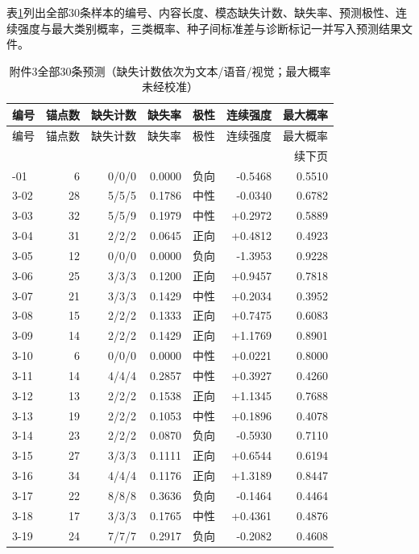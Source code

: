 表\ref{q2:tab:a3}列出全部30条样本的编号、内容长度、模态缺失计数、缺失率、预测极性、连续强度与最大类别概率，三类概率、种子间标准差与诊断标记一并写入预测结果文件。
{\small
\setlength{\tabcolsep}{4pt}
\begin{longtable}{lrrrrrr}
\caption{附件3全部30条预测（缺失计数依次为文本/语音/视觉；最大概率未经校准）}\label{q2:tab:a3}\\
\toprule
编号 & 锚点数 & 缺失计数 & 缺失率 & 极性 & 连续强度 & 最大概率 \\
\midrule
\endfirsthead
\toprule
编号 & 锚点数 & 缺失计数 & 缺失率 & 极性 & 连续强度 & 最大概率 \\
\midrule
\endhead
\midrule
\multicolumn{7}{r}{续下页}\\
\endfoot
\bottomrule
\endlastfoot
3-01 & 6 & 0/0/0 & 0.0000 & 负向 & -0.5468 & 0.5510 \\
3-02 & 28 & 5/5/5 & 0.1786 & 中性 & -0.0340 & 0.6782 \\
3-03 & 32 & 5/5/9 & 0.1979 & 中性 & +0.2972 & 0.5889 \\
3-04 & 31 & 2/2/2 & 0.0645 & 正向 & +0.4812 & 0.4923 \\
3-05 & 12 & 0/0/0 & 0.0000 & 负向 & -1.3953 & 0.9228 \\
3-06 & 25 & 3/3/3 & 0.1200 & 正向 & +0.9457 & 0.7818 \\
3-07 & 21 & 3/3/3 & 0.1429 & 中性 & +0.2034 & 0.3952 \\
3-08 & 15 & 2/2/2 & 0.1333 & 正向 & +0.7475 & 0.6083 \\
3-09 & 14 & 2/2/2 & 0.1429 & 正向 & +1.1769 & 0.8901 \\
3-10 & 6 & 0/0/0 & 0.0000 & 中性 & +0.0221 & 0.8000 \\
3-11 & 14 & 4/4/4 & 0.2857 & 中性 & +0.3927 & 0.4260 \\
3-12 & 13 & 2/2/2 & 0.1538 & 正向 & +1.1345 & 0.7688 \\
3-13 & 19 & 2/2/2 & 0.1053 & 中性 & +0.1896 & 0.4078 \\
3-14 & 23 & 2/2/2 & 0.0870 & 负向 & -0.5930 & 0.7110 \\
3-15 & 27 & 3/3/3 & 0.1111 & 正向 & +0.6544 & 0.6194 \\
3-16 & 34 & 4/4/4 & 0.1176 & 正向 & +1.3189 & 0.8447 \\
3-17 & 22 & 8/8/8 & 0.3636 & 负向 & -0.1464 & 0.4464 \\
3-18 & 17 & 3/3/3 & 0.1765 & 中性 & +0.4361 & 0.4876 \\
3-19 & 24 & 7/7/7 & 0.2917 & 负向 & -0.2082 & 0.4608 \\

\end{longtable}}
